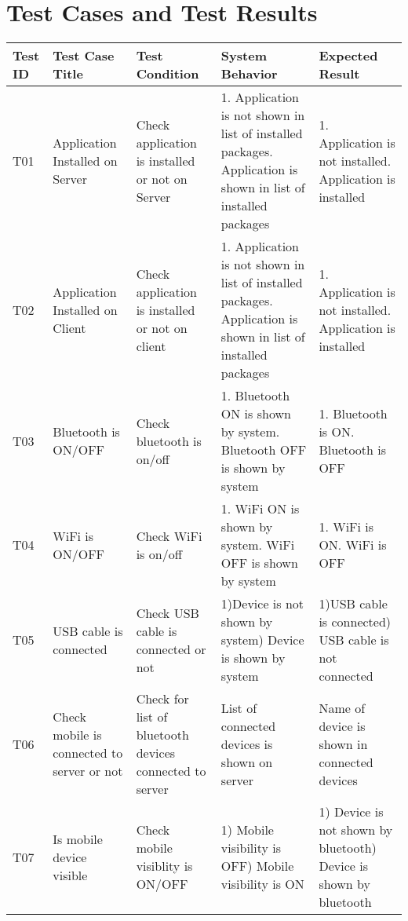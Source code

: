\section{Test Cases and Test Results}
\begin{longtable}{ | p{1cm} | p{3.5cm} | p{4cm} | p{4cm} | p{4cm} |}
      \hline
      \textbf{Test ID} & \textbf{Test Case Title} & \textbf{Test Condition} & \textbf{System Behavior} & \textbf{Expected Result}\\
      \hline
      T01 & Application Installed on Server & Check \newline application is installed or not on Server & 1. Application is not shown in list of installed packages\newline2. Application is shown in list of installed packages & 1. Application is not installed\newline2. Application is installed\\
      \hline
      T02 & Application Installed on Client & Check \newline application is installed or not on client &  1. Application is not shown in list of installed packages\newline2. Application is shown in list of installed packages  & 1. Application is not installed\newline2. Application is installed\\
      \hline
      T03 & Bluetooth is ON/OFF & Check bluetooth is on/off &  1. Bluetooth ON is shown by system\newline 2. Bluetooth OFF is shown by system & 1. Bluetooth is ON\newline 2. Bluetooth is OFF\\
      \hline
      T04 & WiFi is ON/OFF & Check WiFi is on/off & 1. WiFi ON is shown by system\newline 2. WiFi OFF is shown by system & 1. WiFi is ON\newline 2. WiFi is OFF\\
      \hline
      T05 & USB cable is connected & Check USB cable is connected or not & 1)Device is not shown by system\newline 2) Device is shown by system & 1)USB cable is connected\newline 2) USB cable is not connected\\
      \hline
      T06 & Check mobile is connected to server or not & Check for list of bluetooth devices connected to server & List of connected devices is shown on server & Name of device is shown in connected devices\\
      \hline
      T07 & Is mobile device visible & Check mobile visiblity is ON/OFF & 1) Mobile visibility is OFF\newline 2) Mobile visibility is ON & 1) Device is not shown by bluetooth\newline 2) Device is shown by bluetooth\\

\end{longtable}
